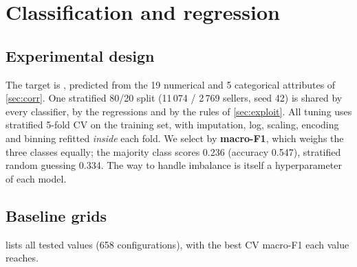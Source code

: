 \section{Classification and regression}\label{sec:m3}

\subsection{Experimental design}
The target is , predicted from the 19 numerical and 5 categorical attributes of \cref{sec:corr}. One stratified 80/20 split (11\,074 / 2\,769 sellers, seed 42) is shared by every classifier, by the regressions and by the rules of \cref{sec:exploit}. All tuning uses stratified 5-fold CV on the training set, with imputation, log, scaling, encoding and binning refitted \emph{inside} each fold. We select by \textbf{macro-F1}, which weighs the three classes equally; the majority class scores 0.236 (accuracy 0.547), stratified random guessing 0.334. The way to handle imbalance is itself a hyperparameter of each model.

\subsection{Baseline grids}\label{sec:grids}
 lists all tested values (658 configurations), with the best CV macro-F1 each value reaches.

